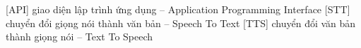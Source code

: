    [API]   {giao diện lập trình ứng dụng -- Application Programming Interface}
 [STT] {chuyển đổi giọng nói thành văn bản -- Speech To Text}
 [TTS] {chuyển đổi văn bản thành giọng nói -- Text To Speech}